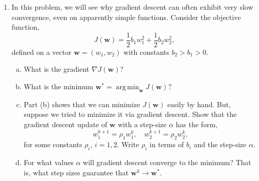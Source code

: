 \documentclass[11pt]{article}
\def\argmin{\mathop{\mathrm{arg\,min}}}
\def\arr{\rightarrow}
\newcommand{\wbf}{\mathbf{w}}
\begin{document}
\begin{enumerate}
\begin{enumerate}[(a)]
The graph shows a parabola with periodic oscillations. The global minimum is at $x=0$ where $f(0) = 1 - \cos(0) = 0$.

\item The gradient is:
$$f'(x) = \frac{1}{2}x + 2\pi\sin(2\pi x)$$

The gradient descent update is:
$$x^{k+1} = x^k - \alpha f'(x^k) = x^k - \alpha\left(\frac{1}{2}x^k + 2\pi\sin(2\pi x^k)\right)$$

\item The global minimum is at $x = 0$, where $f(0) = 0$.

\item A good initial condition that could lead to a local minimum (not global) would be around $x = \pm 1$ or $x = \pm 2$. For example, starting at $x = 1$:
\begin{itemize}
\item At $x = 1$: $f'(1) = \frac{1}{2} + 2\pi\sin(2\pi) = \frac{1}{2} > 0$
\item The gradient is positive, so gradient descent will move left
\item It could converge to a local minimum around $x \approx 0.5$ or $x \approx -0.5$
\end{itemize}

Another example: starting at $x = 2$:
\begin{itemize}
\item At $x = 2$: $f'(2) = 1 + 2\pi\sin(4\pi) = 1 > 0$  
\item The gradient is positive, so gradient descent will move left
\item It could converge to a local minimum around $x \approx 1.5$ or $x \approx 0.5$
\end{itemize}
\end{enumerate}


\item In this problem, we will see why gradient descent can often exhibit
very slow convergence, even on apparently simple functions.
Consider the objective function,
\[
    J(\wbf) = \frac{1}{2}b_1w_1^2 + \frac{1}{2}b_2w_2^2,
\]
defined on a vector $\wbf=(w_1,w_2)$ with constants $b_2 > b_1 > 0$.
\begin{enumerate}[(a)]
  \item What is the gradient $\nabla J(\wbf)$?
  \item What is the minimum $\wbf^* = \argmin_{\wbf} J(\wbf)$?
  \item Part (b) shows that we can minimize $J(\wbf)$ easily by hand.
  But, suppose we tried to minimize it via gradient descent.
  Show that the gradient descent update of $\wbf$ with a step-size $\alpha$
has the form,
\[
    w_1^{k+1} = \rho_1 w_1^k, \quad w_2^{k+1} = \rho_2 w_2^k,
\]
for some constants $\rho_i$, $i=1,2$.  Write $\rho_i$ in terms of
$b_i$ and the step-size $\alpha$.
  \item For what values $\alpha$ will gradient descent converge to the minimum? That is, what step sizes guarantee that $\wbf^k \arr \wbf^*$.


\end{enumerate}
\end{enumerate}
\end{document}

